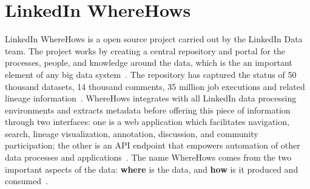 \section{LinkedIn WhereHows}

LinkedIn WhereHows is a open source project carried out by the LinkedIn Data team. The project works 
by creating a central repository and portal for the processes, people, and knowledge around the data, 
which is the an important element of any big data system~\cite{hid-sp18-405-www-wherehows}. The 
repository has captured the status of 50 thousand datasets, 14 thousand comments, 35 million job 
executions and related lineage information~\cite{hid-sp18-405-www-wherehows}. WhereHows 
integrates with all LinkedIn data processing environments and extracts metadata before offering this 
piece of information through two interfaces: one is a web application which facilitates navigation, 
search, lineage visualization, annotation, discussion, and community participation; the other is 
an API endpoint that empowers automation of other data processes and 
applications~\cite{hid-sp18-405-www-wherehows}. The name WhereHows comes from the  two 
important aspects of the data: \textbf{where} is the data, and \textbf{how} is it produced and 
consumed~\cite{hid-sp18-405-githubwiki-wherehows}.
